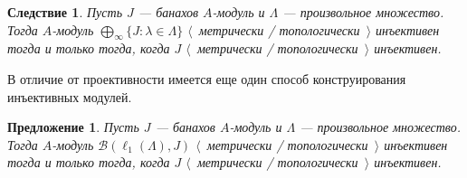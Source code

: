 \documentclass[12pt]{article}
\newtheorem{proposition}[theorem]{Предложение}
\newtheorem{corollary}[theorem]{Следствие}
\begin{document}
\begin{corollary}\label{MetTopInjlInftySum} Пусть $J$ --- банахов $A$-модуль и
    $\Lambda$ --- произвольное множество. Тогда $A$-модуль  $\bigoplus_\infty
        \{J:\lambda\in\Lambda \}$ $\langle$~метрически / топологически~$\rangle$
    инъективен тогда и только тогда, когда $J$ $\langle$~метрически /
    топологически~$\rangle$ инъективен.
\end{corollary}

В отличие от проективности имеется еще один способ конструирования инъективных
модулей.

\begin{proposition}\label{MapsFroml1toMetTopInj} Пусть $J$ --- банахов
    $A$-модуль и $\Lambda$ --- произвольное множество. Тогда $A$-модуль
    $\mathcal{B}(\ell_1(\Lambda),J)$ $\langle$~метрически /
    топологически~$\rangle$ инъективен тогда и только тогда, когда $J$
    $\langle$~метрически / топологически~$\rangle$ инъективен.
\end{proposition}
\end{document}
